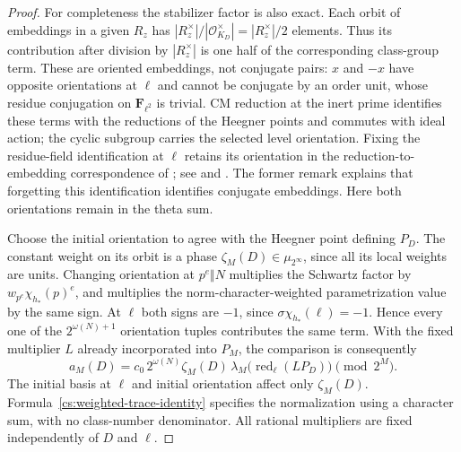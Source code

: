 \begin{proof}
For completeness the stabilizer factor is also exact.  Each orbit of
embeddings in a given $R_z$ has
$|R_z^\times|/|\mathcal O_{K_D}^\times|=|R_z^\times|/2$ elements.
Thus its contribution after division by $|R_z^\times|$ is one half of
the corresponding class-group term. These are oriented embeddings,
not conjugate pairs: $x$ and $-x$ have opposite orientations at $\ell$
and cannot be conjugate by an order unit, whose residue conjugation
on $\mathbf F_{\ell^2}$ is trivial.  CM reduction at the inert prime
identifies these terms with the reductions of the Heegner points and
commutes with ideal action; the cyclic subgroup carries the selected
level orientation.  Fixing the residue-field identification at $\ell$
retains its orientation in the reduction-to-embedding correspondence
of \citet{Deuring1941}; see
\citep[arXiv version~1, Theorem~3.1, Corollary~3.2, and Section~3.6,
Remark~1]{CornutJetchev2013} and
\citep[Sections~2.4--2.6 and~4.1]{JetchevKane2011}.
The former remark explains that forgetting this identification
identifies conjugate embeddings.  Here both orientations remain in
the theta sum.

Choose the initial orientation to agree with the Heegner point defining
$P_D$.  The constant weight on its orbit is a phase
$\zeta_M(D)\in\mu_{2^\infty}$, since all its local weights are units.
Changing orientation at $p^e\Vert N$ multiplies the Schwartz factor by
$w_{p^e}\chi_{h_*}(p)^e$, and multiplies the norm-character-weighted
parametrization value by the same sign.  At $\ell$ both signs are $-1$,
since $\sigma\chi_{h_*}(\ell)=-1$.  Hence every one of the
$2^{\omega(N)+1}$ orientation tuples contributes the same term.
With the fixed multiplier $L$ already incorporated into $P_M$, the
comparison is consequently
\begin{equation}
 a_M(D)=c_0\,2^{\omega(N)}\zeta_M(D)\,
           \lambda_M\bigl(\operatorname{red}_{\ell}(L P_D)\bigr)
                           \pmod{2^M}.
\label{cs:weighted-trace-identity}
\end{equation}
The initial basis at $\ell$ and initial orientation affect only
$\zeta_M(D)$.  Formula~\eqref{cs:weighted-trace-identity} specifies the
normalization using a character sum, with no class-number denominator.
All rational multipliers are fixed independently of $D$ and $\ell$.


\end{proof}
